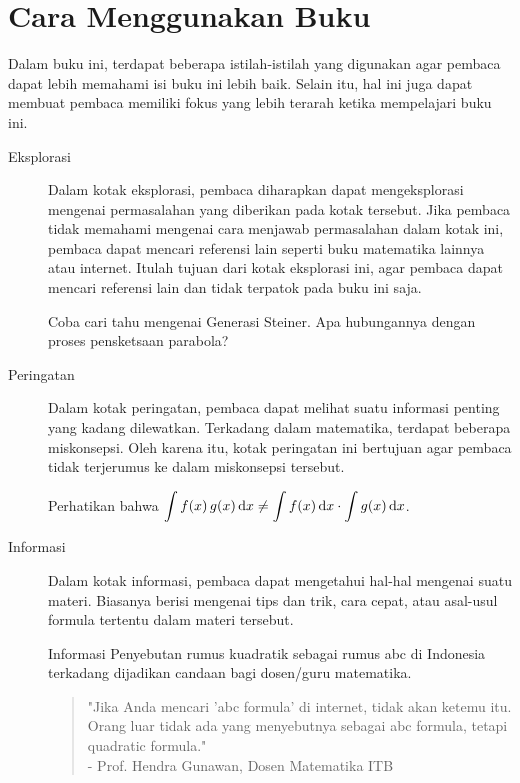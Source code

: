 \chapter{Cara Menggunakan Buku}

Dalam buku ini, terdapat beberapa istilah-istilah yang digunakan agar pembaca dapat lebih memahami isi buku ini lebih baik. Selain itu, hal ini juga dapat membuat pembaca memiliki fokus yang lebih terarah ketika mempelajari buku ini.

\begin{description}
	\item[Eksplorasi] Dalam kotak eksplorasi, pembaca diharapkan dapat mengeksplorasi mengenai permasalahan yang diberikan pada kotak tersebut. Jika pembaca tidak memahami mengenai cara menjawab permasalahan dalam kotak ini, pembaca dapat mencari referensi lain seperti buku matematika lainnya atau internet. Itulah tujuan dari kotak eksplorasi ini, agar pembaca dapat mencari referensi lain dan tidak terpatok pada buku ini saja.
	\begin{explbox}
		Coba cari tahu mengenai Generasi Steiner. Apa hubungannya dengan proses pensketsaan parabola?
	\end{explbox}
	\item[Peringatan] Dalam kotak peringatan, pembaca dapat melihat suatu informasi penting yang kadang dilewatkan. Terkadang dalam matematika, terdapat beberapa miskonsepsi. Oleh karena itu, kotak peringatan ini bertujuan agar pembaca tidak terjerumus ke dalam miskonsepsi tersebut.
	\begin{warningbox}
		Perhatikan bahwa $ \displaystyle{\int{\mathop{}\!{f}{\left({x}\right)}\mathop{}\!{g}{\left({x}\right)} \mathop{}\!\mathrm{d}{x}}} \ne \displaystyle{\int{\mathop{}\!{f}{\left({x}\right)} \mathop{}\!\mathrm{d}{x}} \cdot \int{\mathop{}\!{g}{\left({x}\right)} \mathop{}\!\mathrm{d}{x}}} $.
	\end{warningbox}
	\item[Informasi] Dalam kotak informasi, pembaca dapat mengetahui hal-hal mengenai suatu materi. Biasanya berisi mengenai tips dan trik, cara cepat, atau asal-usul formula tertentu dalam materi tersebut.
	\begin{infobox}{Informasi}
		Penyebutan rumus kuadratik sebagai rumus abc di Indonesia terkadang dijadikan candaan bagi dosen/guru matematika.
		\begin{quote}
			"Jika Anda mencari 'abc formula' di internet, tidak akan ketemu itu. Orang luar tidak ada yang menyebutnya sebagai abc formula, tetapi quadratic formula." \\[4pt]
			- Prof. Hendra Gunawan, Dosen Matematika ITB
		\end{quote}

\end{infobox}
\end{description}
